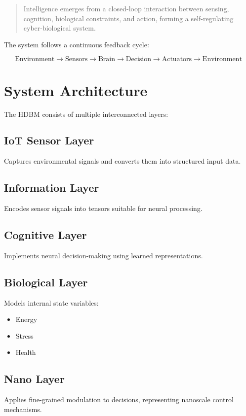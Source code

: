 \documentclass[12pt]{article}
\begin{document}
\begin{quote}
Intelligence emerges from a closed-loop interaction between sensing, cognition, biological constraints, and action, forming a self-regulating cyber-biological system.
\end{quote}

The system follows a continuous feedback cycle:

\[
\text{Environment} \rightarrow \text{Sensors} \rightarrow \text{Brain} \rightarrow \text{Decision} \rightarrow \text{Actuators} \rightarrow \text{Environment}
\]

\section{System Architecture}

The HDBM consists of multiple interconnected layers:

\subsection{IoT Sensor Layer}
Captures environmental signals and converts them into structured input data.

\subsection{Information Layer}
Encodes sensor signals into tensors suitable for neural processing.

\subsection{Cognitive Layer}
Implements neural decision-making using learned representations.

\subsection{Biological Layer}
Models internal state variables:

\begin{itemize}
\item Energy
\item Stress
\item Health
\end{itemize}

\subsection{Nano Layer}
Applies fine-grained modulation to decisions, representing nanoscale control mechanisms.
\end{document}
